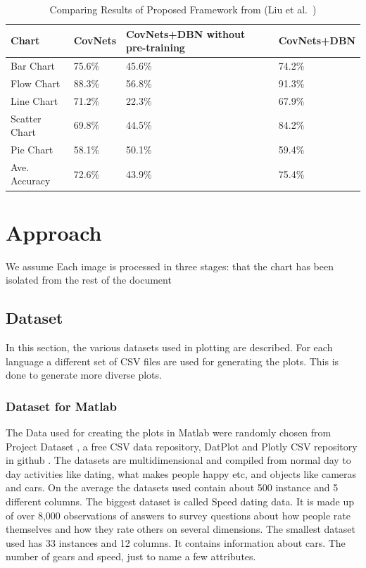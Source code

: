 \documentclass[12pt, a4paper,oneside]{report}
\begin{document}
\begin{table}[h]
	\centering {} \small
	\begin{tabular}{|p{3cm}|p{3cm}|p{3cm}|p{3cm}|}
		
		\hline
		Chart & CovNets&CovNets+DBN without pre-training & CovNets+DBN \\ \hline
				
		Bar Chart & 75.6\% & 45.6\% & 74.2\% \\ \hline
		Flow Chart & 88.3\%  & 56.8\% & 91.3\%  \\ \hline
		Line Chart  & 71.2\%  & 22.3\% & 67.9\% \\ \hline
	
		Scatter Chart & 69.8\% & 44.5\% & 84.2\% \\ \hline
		Pie Chart & 58.1\%  & 50.1\% & 59.4\%    \\ \hline
		Ave. Accuracy & 72.6\%  & 43.9\% & 75.4\% \\ \hline
		
	\end{tabular}
	\caption {Comparing Results of Proposed Framework from (Liu et al.~\cite{liu2015chart}) }	
	\label{table:deep}
	
\end{table}


\chapter{Approach}
We assume Each image is processed in three stages:
that the chart has been isolated from the rest of the document

\section{Dataset}
In this section, the various datasets used in plotting are described. For each language a different set of CSV files are used for generating the plots. This is done to generate more diverse plots.

\subsection{Dataset for Matlab}
The Data used for creating the plots in Matlab were randomly chosen from Project Dataset \cite{projectdataset}, a free CSV data repository, DatPlot \cite{datplot} and Plotly CSV repository in github \cite{plotly}. The datasets are multidimensional and compiled from normal day to day activities like dating, what makes people happy etc, and objects like cameras and cars. On the average the datasets used contain about 500 instance and 5 different columns. The biggest dataset is called Speed dating data. It is made up of over 8,000 observations of answers to survey questions about how people rate themselves and how they rate others on several dimensions. The smallest dataset used has 33 instances and 12 columns. It contains information about cars. The number of gears and speed, just to name a few attributes.
\end{document}
